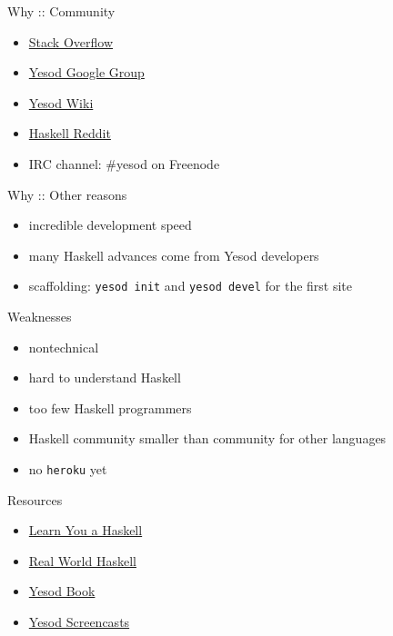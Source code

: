 \documentclass{beamer}
\begin{document}
\begin{frame}{Why :: Community}
  \begin{itemize}
    \item \href{http://stackoverflow.com/questions/tagged/yesod}{Stack Overflow}
    \item \href{http://groups.google.com/group/yesodweb}{Yesod Google Group}
    \item \href{http://www.yesodweb.com/wiki}{Yesod Wiki}
    \item \href{http://www.reddit.com/r/haskell/}{Haskell Reddit}
    \item IRC channel: \#yesod on Freenode
  \end{itemize}
\end{frame}

\begin{frame}{Why :: Other reasons}
  \begin{itemize}
    \item incredible development speed
    \item many Haskell advances come from Yesod developers
    \item scaffolding: \texttt{yesod init} and \texttt{yesod devel} for the
    first site
  \end{itemize}
\end{frame}

\begin{frame}{Weaknesses}
  \begin{itemize}
    \item nontechnical
    \pause
    \item hard to understand Haskell
    \item too few Haskell programmers
    \item Haskell community smaller than community for other languages
    \item no \texttt{heroku} yet
  \end{itemize}
\end{frame}

\begin{frame}{Resources}
  \begin{itemize}
    \item \href{http://learnyouahaskell.com/}{Learn You a Haskell}
    \item \href{http://book.realworldhaskell.org/read/}{Real World Haskell}
    \item \href{http://www.yesodweb.com/book}{Yesod Book}
    \item \href{http://www.yesodweb.com/page/screencasts}{Yesod Screencasts}
  \end{itemize}
\end{frame}
\end{document}
